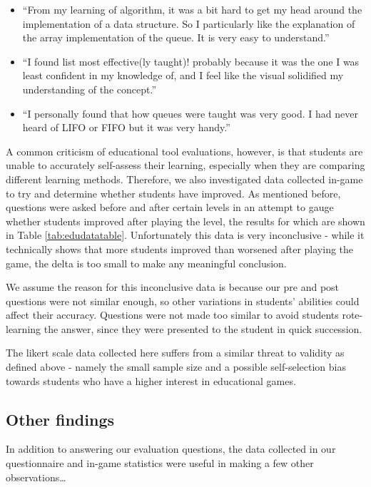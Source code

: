 \documentclass[11pt]{article}
\begin{document}
\begin{spacing}{1.5}
\begin{itemize}
  \item ``From my learning of algorithm, it was a bit hard to get my head around the implementation of a data structure. So I particularly like the explanation of the array implementation of the queue. It is very easy to understand.''
  \item ``I found list most effective(ly taught)! probably because it was the one I was least confident in my knowledge of, and I feel like the visual solidified my understanding of the concept.''
  \item ``I personally found that how queues were taught was very good. I had never heard of LIFO or FIFO but it was very handy.''
\end{itemize}
\end{spacing}
A common criticism of educational tool evaluations, however, is that students are unable to accurately self-assess their learning, especially when they are comparing different learning methods\cite{Battistella}. Therefore, we also investigated data collected in-game to try and determine whether students have improved. As mentioned before, questions were asked before and after certain levels in an attempt to gauge whether students improved after playing the level, the results for which are shown in Table \ref{tab:edudatatable}. Unfortunately this data is very inconclusive - while it technically shows that more students improved than worsened after playing the game, the delta is too small to make any meaningful conclusion.\par
We assume the reason for this inconclusive data is because our pre and post questions were not similar enough, so other variations in students' abilities could affect their accuracy. Questions were not made too similar to avoid students rote-learning the answer, since they were presented to the student in quick succession.\par
The likert scale data collected here suffers from a similar threat to validity as defined above - namely the small sample size and a possible self-selection bias towards students who have a higher interest in educational games.
\subsection{Other findings}
In addition to answering our evaluation questions, the data collected in our questionnaire and in-game statistics were useful in making a few other observations\dots
\end{document}
